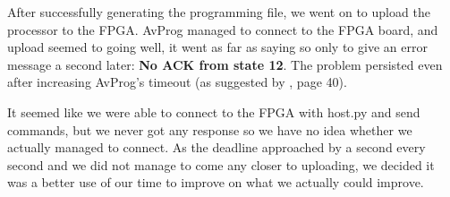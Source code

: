 After successfully generating the programming file, we went on to upload the processor to the FPGA.
AvProg managed to connect to the FPGA board, and upload seemed to going well, it went as far as saying so only to give an error message a second later: \textbf{No ACK from state 12}.
The problem persisted even after increasing AvProg's timeout (as suggested by \cite{avnet-programming-user-manual}, page 40).

It seemed like we were able to connect to the FPGA with host.py and send commands, but we never got any response so we have no idea whether we actually managed to connect.
As the deadline approached by a second every second and we did not manage to come any closer to uploading, we decided it was a better use of our time to improve on what we actually could improve.
